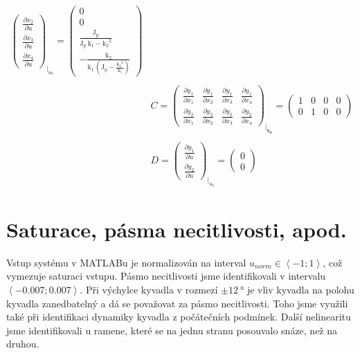 \documentclass[a4paper,12pt]{article}
\begin{document}
{\begin{align*}
\begin{pmatrix}
\frac{\partial x_2}{\partial u}	\\
\frac{\partial x_3}{\partial u}	\\
\frac{\partial x_4}{\partial u}
\end{pmatrix}_{\biggr\rvert_{u_0}} =
\left(\begin{array}{c} 0\\ 0\\ \frac{\mathrm{J_p}}{\mathrm{J_p}\, \mathrm{k_1} - {\mathrm{k_2}}^2}\\ -\frac{\mathrm{k_2}}{\mathrm{k_1}\, \left(\mathrm{J_p} - \frac{{\mathrm{k_2}}^2}{\mathrm{k_1}}\right)} \end{array}\right)	\\ \\
&C =
\begin{pmatrix}
\frac{\partial y_1}{\partial x_1} & \frac{\partial y_1}{\partial x_2} & \frac{\partial y_1}{\partial x_3} & \frac{\partial y_1}{\partial x_4}	\\
\frac{\partial y_2}{\partial x_1} & \frac{\partial y_2}{\partial x_2} & \frac{\partial y_2}{\partial x_3} & \frac{\partial y_2}{\partial x_4}
\end{pmatrix}_{\biggr\rvert_\mathbf{x_0}} =
\left(\begin{array}{cccc} 1 & 0 & 0 & 0\\ 0 & 1 & 0 & 0 \end{array}\right)	\\ \\
&D =
\begin{pmatrix}
\frac{\partial y_1}{\partial u}	\\
\frac{\partial y_2}{\partial u}
\end{pmatrix}_{\biggr\rvert_{u_0}} =
\left(\begin{array}{c} 0\\ 0 \end{array}\right)
\end{align*}
}

\newpage
\section{Saturace, pásma necitlivosti, apod.}
Vstup systému v MATLABu je normalizován na interval $u_{norm} \in \left<-1; 1\right>$, což vymezuje saturaci vstupu. Pásmo necitlivosti jsme identifikovali v intervalu $\left<-0.007; 0.007\right>$.
\newline
\newline
Při výchylce kyvadla v rozmezí $\pm \SI{12}{\degree}$ je vliv kyvadla na polohu kyvadla zanedbatelný a dá se považovat za pásmo necitlivosti. Toho jsme využili také při identifikaci dynamiky kyvadla z počátečních podmínek.
\newline
\newline
Další nelinearitu jsme identifikovali u ramene, které se na jednu stranu posouvalo snáze, než na druhou.
\end{document}
